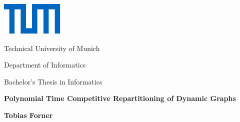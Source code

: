
	\begin{titlepage}
		\begin{center}
			\includegraphics{res/Universitaet_Logo_RGB.pdf}
			\vspace*{1cm}
			
			\large
			Technical University of Munich\\
			\vspace*{1cm}
			
			Department of Informatics\\
			\vspace*{1cm}
			
			Bachelor's Thesis in Informatics\\
			\vspace*{1cm}
			
			\Huge
			\textbf{Polynomial Time Competitive Repartitioning of Dynamic Graphs}\\
			
			
			\vspace{2cm}
			
			\Large
			\textbf{Tobias Forner}
			
			\vfill
			
		\end{center}
	\end{titlepage}
	
